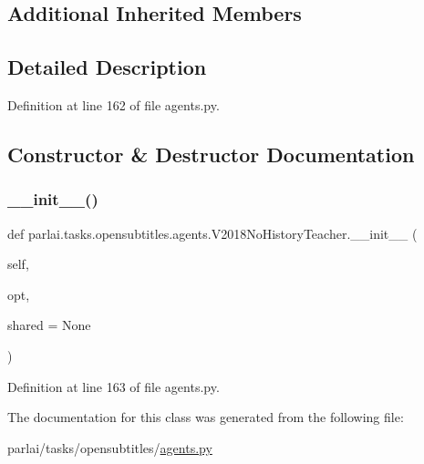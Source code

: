 \subsection*{Additional Inherited Members}


\subsection{Detailed Description}


Definition at line 162 of file agents.\+py.



\subsection{Constructor \& Destructor Documentation}
\mbox{\label{classparlai_1_1tasks_1_1opensubtitles_1_1agents_1_1V2018NoHistoryTeacher_a8341ce8f3cf5d53180d47db11ac0d397}} 
\subsubsection{\texorpdfstring{\+\_\+\+\_\+init\+\_\+\+\_\+()}{\_\_init\_\_()}}
{\footnotesize\ttfamily def parlai.\+tasks.\+opensubtitles.\+agents.\+V2018\+No\+History\+Teacher.\+\_\+\+\_\+init\+\_\+\+\_\+ (\begin{DoxyParamCaption}\item[{}]{self,  }\item[{}]{opt,  }\item[{}]{shared = {\ttfamily None} }\end{DoxyParamCaption})}



Definition at line 163 of file agents.\+py.



The documentation for this class was generated from the following file\+:\begin{DoxyCompactItemize}
\item 
parlai/tasks/opensubtitles/\hyperlink{parlai_2tasks_2opensubtitles_2agents_8py}{agents.\+py}\end{DoxyCompactItemize}
